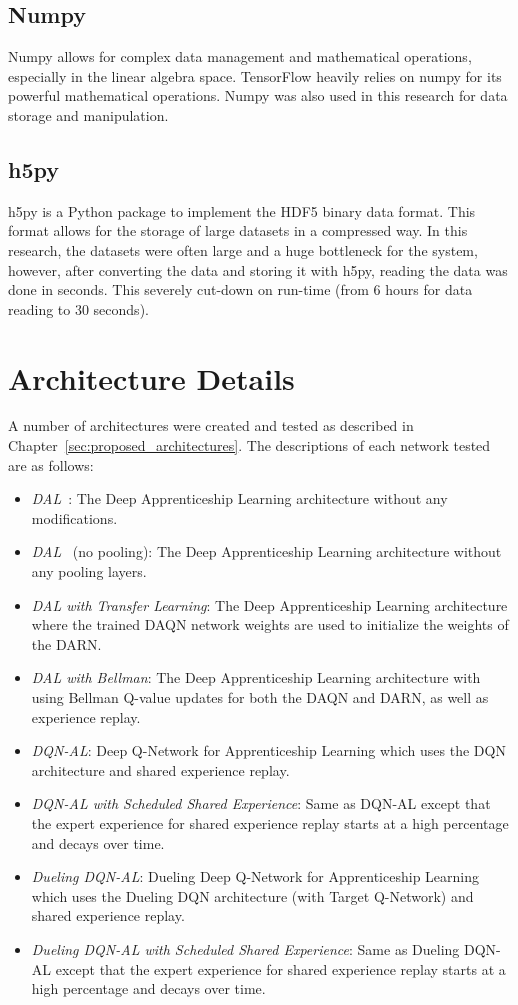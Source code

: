 \documentclass[12pt,american]{report}
\begin{document}
\subsection{Numpy}
Numpy allows for complex data management and mathematical operations, especially in the linear algebra space.  TensorFlow heavily relies on numpy for its powerful mathematical operations.  Numpy was also used in this research for data storage and manipulation. 
\subsection{h5py}
h5py is a Python package to implement the HDF5 binary data format.  This format allows for the storage of large datasets in a compressed way.  In this research, the datasets were often large and a huge bottleneck for the system, however, after converting the data and storing it with h5py, reading the data was done in seconds.  This severely cut-down on run-time (from 6 hours for data reading to 30 seconds). 

\section{Architecture Details}
\label{sec:arch_details}
A number of architectures were created and tested as described in Chapter~\ref{sec:proposed_architectures}. The descriptions of each network tested are as follows:
\begin{itemize}
	\item \textit{DAL}~\cite{markovikj2014deep}: The Deep Apprenticeship Learning architecture without any modifications.
	\item \textit{DAL}~\cite{markovikj2014deep} (no pooling): The Deep Apprenticeship Learning architecture without any pooling layers.
    \item \textit{DAL with Transfer Learning}: The Deep Apprenticeship Learning architecture where the trained DAQN network weights are used to initialize the weights of the DARN.
    \item \textit{DAL with Bellman}: The Deep Apprenticeship Learning architecture with using Bellman Q-value updates for both the DAQN and DARN, as well as experience replay.
    \item \textit{DQN-AL}: Deep Q-Network for Apprenticeship Learning which uses the DQN architecture and shared experience replay.
    \item \textit{DQN-AL with Scheduled Shared Experience}: Same as DQN-AL except that the expert experience for shared experience replay starts at a high percentage and decays over time.
	\item \textit{Dueling DQN-AL}: Dueling Deep Q-Network for Apprenticeship Learning which uses the Dueling DQN architecture (with Target Q-Network) and shared experience replay.
    \item \textit{Dueling DQN-AL with Scheduled Shared Experience}: Same as Dueling DQN-AL except that the expert experience for shared experience replay starts at a high percentage and decays over time.
\end{itemize}
\end{document}
